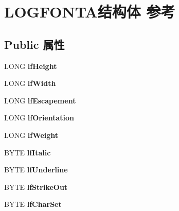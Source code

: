 \hypertarget{struct_l_o_g_f_o_n_t_a}{}\section{L\+O\+G\+F\+O\+N\+T\+A结构体 参考}
\label{struct_l_o_g_f_o_n_t_a}
\subsection*{Public 属性}
\begin{DoxyCompactItemize}
\item 
\mbox{\label{struct_l_o_g_f_o_n_t_a_abd0f03fb1a4a5a450f5f230af7382123}} 
L\+O\+NG {\bfseries lf\+Height}
\item 
\mbox{\label{struct_l_o_g_f_o_n_t_a_af91a57a1daa4884157f87a5fd7418b45}} 
L\+O\+NG {\bfseries lf\+Width}
\item 
\mbox{\label{struct_l_o_g_f_o_n_t_a_abd6bb37374b46ddacd1f566d9ccce0be}} 
L\+O\+NG {\bfseries lf\+Escapement}
\item 
\mbox{\label{struct_l_o_g_f_o_n_t_a_a889a4ecdbbe9bd168fec1618e6b7970c}} 
L\+O\+NG {\bfseries lf\+Orientation}
\item 
\mbox{\label{struct_l_o_g_f_o_n_t_a_ad45252be1c1187b3489c6a2988049019}} 
L\+O\+NG {\bfseries lf\+Weight}
\item 
\mbox{\label{struct_l_o_g_f_o_n_t_a_a88f133ac389d7a8c6a3cb051c5cd9e31}} 
B\+Y\+TE {\bfseries lf\+Italic}
\item 
\mbox{\label{struct_l_o_g_f_o_n_t_a_a7e3797675e25862a73e9d99f4749f231}} 
B\+Y\+TE {\bfseries lf\+Underline}
\item 
\mbox{\label{struct_l_o_g_f_o_n_t_a_a1b92ff11ad39493f5a2b6fc86eed54ff}} 
B\+Y\+TE {\bfseries lf\+Strike\+Out}
\item 
\mbox{\label{struct_l_o_g_f_o_n_t_a_acbcb0548ba3a91fde96f0c7efcdc9143}} 
B\+Y\+TE {\bfseries lf\+Char\+Set}
\item 

\end{DoxyCompactItemize}
